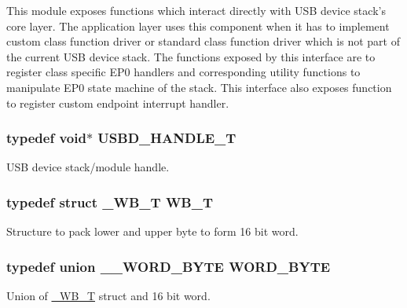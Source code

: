 This module exposes functions which interact directly with U\-S\-B device stack's core layer. The application layer uses this component when it has to implement custom class function driver or standard class function driver which is not part of the current U\-S\-B device stack. The functions exposed by this interface are to register class specific E\-P0 handlers and corresponding utility functions to manipulate E\-P0 state machine of the stack. This interface also exposes function to register custom endpoint interrupt handler. \hypertarget{group__USBD__Core_gafdbb2204d929cb9d75736bd2b42342ac}{
\subsubsection[{U\-S\-B\-D\-\_\-\-H\-A\-N\-D\-L\-E\-\_\-\-T}]{\setlength{\rightskip}{0pt plus 5cm}typedef {\bf void}$\ast$ {\bf U\-S\-B\-D\-\_\-\-H\-A\-N\-D\-L\-E\-\_\-\-T}}}\label{group__USBD__Core_gafdbb2204d929cb9d75736bd2b42342ac}
U\-S\-B device stack/module handle. \hypertarget{group__USBD__Core_ga4fbe30f5ac133f5bb15c653a19162ae9}{
\subsubsection[{W\-B\-\_\-\-T}]{\setlength{\rightskip}{0pt plus 5cm}typedef struct {\bf \-\_\-\-W\-B\-\_\-\-T} {\bf W\-B\-\_\-\-T}}}\label{group__USBD__Core_ga4fbe30f5ac133f5bb15c653a19162ae9}
Structure to pack lower and upper byte to form 16 bit word. \hypertarget{group__USBD__Core_ga340ec8de2973608b96d5cc7379b9561a}{
\subsubsection[{W\-O\-R\-D\-\_\-\-B\-Y\-T\-E}]{\setlength{\rightskip}{0pt plus 5cm}typedef union {\bf \-\_\-\-\_\-\-W\-O\-R\-D\-\_\-\-B\-Y\-T\-E} {\bf W\-O\-R\-D\-\_\-\-B\-Y\-T\-E}}}\label{group__USBD__Core_ga340ec8de2973608b96d5cc7379b9561a}
Union of \hyperlink{struct__WB__T}{\-\_\-\-W\-B\-\_\-\-T} struct and 16 bit word. 
